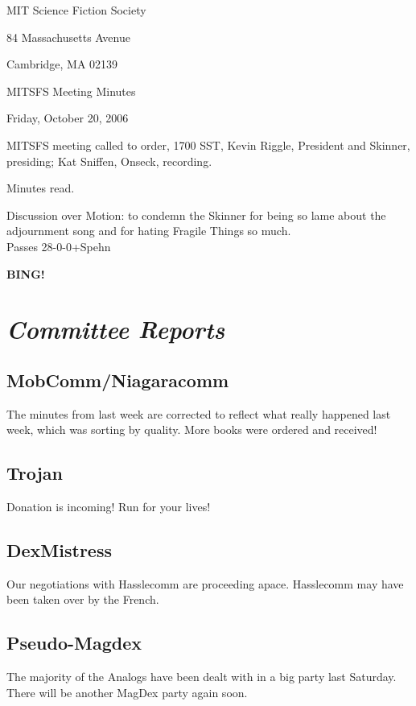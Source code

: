 \documentclass[10pt]{article}
\newcommand{\bing}{{\bf BING!} }
\newcommand{\goto}[1]{\bing \vskip 12pt \section*{{\em{#1}}}}
\begin{document}
\begin{center}

MIT Science Fiction Society

84 Massachusetts Avenue

Cambridge, MA 02139

\vspace{12pt}

MITSFS Meeting Minutes

Friday, October 20, 2006

\end{center}

\vspace{18pt}

\setlength{\parskip}{6pt}

\noindent
MITSFS meeting called to order, 1700 SST,
Kevin Riggle, President and Skinner, presiding; Kat Sniffen, Onseck, recording.

Minutes read.

Discussion over
Motion: to condemn the Skinner for being so lame about the adjournment
song and for hating Fragile Things so much.\\
Passes 28-0-0+Spehn


\goto{Committee Reports}

\subsection*{MobComm/Niagaracomm}
The minutes from last week are corrected to reflect what really
happened last week, which was sorting by quality.  More books were
ordered and received!

\subsection*{Trojan}
Donation is incoming! Run for your lives!

\subsection*{DexMistress}
Our negotiations with Hasslecomm are proceeding apace.  Hasslecomm may
have been taken over by the French.
\subsection*{Pseudo-Magdex}
The majority of the Analogs have been dealt with in a big party last
Saturday.  There will be another MagDex party again soon.
\end{document}
